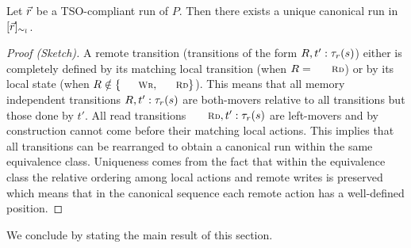 \documentclass[preprint,9pt]{sigplanconf}
\begin{document}
\begin{lemma}\label{lem:canonical}
Let $\vec{r}$ be a TSO-compliant run of $P$.
Then there exists a unique canonical run in $[\vec{r}]_{\sim_l}$.
\end{lemma}
\begin{proof}[Proof (Sketch)]
A remote transition (transitions of the form $R,t':\tau_{r}(s)$) either is completely defined by its matching local transition (when $R=\textnormal{\sc\small Rd}$) or by its local state (when $R\notin\{\textnormal{\sc\small Wr},\textnormal{\sc\small Rd}\}$).
This means that all memory independent transitions $R,t':\tau_{r}(s)$ are both-movers relative to all transitions but those done by $t'$.
All read transitions $\textnormal{\sc\small Rd},t':\aliremtransx s$ are left-movers and by construction cannot come before their matching local actions.
This implies that all transitions can be rearranged to obtain a canonical run within the same equivalence class.
Uniqueness comes from the fact that within the equivalence class the relative ordering among local actions and remote writes is preserved which means that in the canonical sequence each remote action has a well-defined position.
\end{proof}
We conclude by stating the main result of this section.
\end{document}
